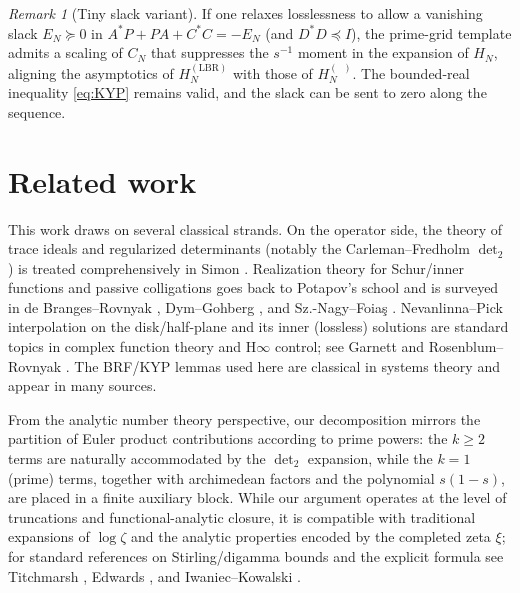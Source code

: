 \documentclass[11pt]{article}
\theoremstyle{definition}
\theoremstyle{remark}
\newtheorem{remark}[theorem]{Remark}
\DeclareMathOperator{\dettwo}{det_2}
\begin{document}
\begin{remark}[Tiny slack variant]
If one relaxes losslessness to allow a vanishing slack \(E_N\succeq 0\) in \(A^*P+PA+C^*C=-E_N\) (and \(D^*D\preceq I\)), the prime-grid template admits a scaling of \(C_N\) that suppresses the \(s^{-1}\) moment in the expansion of \(H_N\), aligning the asymptotics of \(H_N^{(\mathrm{LBR})}\) with those of \(H_N^{(\dettwo)}\). The bounded-real inequality \eqref{eq:KYP} remains valid, and the slack can be sent to zero along the sequence.
\end{remark}

\section{Related work}\label{sec:related}
This work draws on several classical strands. On the operator side, the theory of trace ideals and regularized determinants (notably the Carleman--Fredholm \(\det_2\)) is treated comprehensively in Simon \cite{SimonTraceIdeals}. Realization theory for Schur/inner functions and passive colligations goes back to Potapov's school and is surveyed in de Branges--Rovnyak \cite{deBrangesRovnyak}, Dym--Gohberg \cite{DymGohberg}, and Sz.-Nagy--Foia\c{s} \cite{SzNagyFoias}. Nevanlinna--Pick interpolation on the disk/half-plane and its inner (lossless) solutions are standard topics in complex function theory and H\(\infty\) control; see Garnett \cite{Garnett} and Rosenblum--Rovnyak \cite{RosenblumRovnyak}. The BRF/KYP lemmas used here are classical in systems theory and appear in many sources.

From the analytic number theory perspective, our decomposition mirrors the partition of Euler product contributions according to prime powers: the \(k\ge 2\) terms are naturally accommodated by the \(\det_2\) expansion, while the \(k=1\) (prime) terms, together with archimedean factors and the polynomial \(s(1-s)\), are placed in a finite auxiliary block. While our argument operates at the level of truncations and functional-analytic closure, it is compatible with traditional expansions of \(\log \zeta\) and the analytic properties encoded by the completed zeta \(\xi\); for standard references on Stirling/digamma bounds and the explicit formula see Titchmarsh \cite{TitchmarshZeta}, Edwards \cite{Edwards}, and Iwaniec--Kowalski \cite{IwaniecKowalski}.
\end{document}
